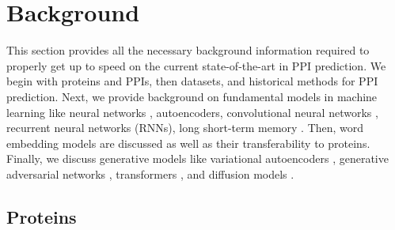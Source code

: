 \documentclass{article}
\begin{document}
\section{Background}
This section provides all the necessary background information required to properly get up to speed on the current state-of-the-art in PPI prediction. We begin with proteins and PPIs, then datasets, and historical methods for PPI prediction. Next, we provide background on fundamental models in machine learning like neural networks \citep[NNs;][]{rosenblatt_perceptron_1958}, autoencoders, convolutional neural networks \citep[CNNs;][]{lecun_backpropagation_1989}, recurrent neural networks (RNNs), long short-term memory \citep[LSTMs;][]{lstm}. Then, word embedding models are discussed as well as their transferability to proteins. Finally, we discuss generative models like variational autoencoders \citep[VAEs;][]{kingma_vae_2013}, generative adversarial networks \citep[GANs;][]{goodfellow2014generative}, transformers \citep{vaswani_attention_2017}, and diffusion models \citep{sohl-dickstein_deep_nodate}.

\subsection{Proteins}
\end{document}
